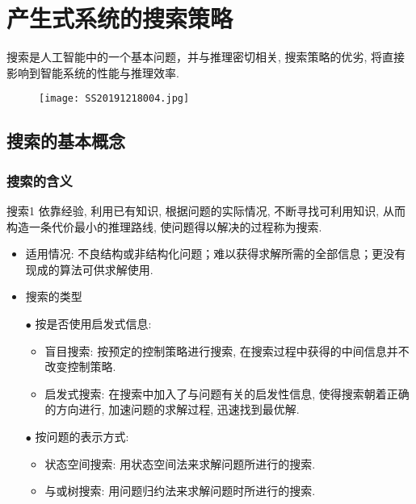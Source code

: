 \chapter{产生式系统的搜索策略}\label{AIchap4}
\begin{tcolorbox}[colback=white!50,colframe=orange!50,title=搜索]
搜索是人工智能中的一个基本问题，并与推理密切相关, 搜索策略的优劣, 将直接影响到智能系统的性能与推理效率.\hfill
\end{tcolorbox}
\begin{figure}[H]
\centering
\texttt{[image: SS20191218004.jpg]}
\label{SS20191218004}
\end{figure}
\section{搜索的基本概念}
\subsection{搜索的含义}
\begin{mydef}{搜索}{1}
依靠经验, 利用已有知识, 根据问题的实际情况, 不断寻找可利用知识, 从而构造一条代价最小的推理路线, 使问题得以解决的过程称为搜索.
\end{mydef}

\begin{itemize}
\item 适用情况: 不良结构或非结构化问题；难以获得求解所需的全部信息；更没有现成的算法可供求解使用.
\item 搜索的类型

    $\bullet$ 按是否使用启发式信息:
    \begin{itemize}
        \item 盲目搜索: 按预定的控制策略进行搜索, 在搜索过程中获得的中间信息并不改变控制策略.
        \item 启发式搜索: 在搜索中加入了与问题有关的启发性信息, 使得搜索朝着正确的方向进行, 加速问题的求解过程, 迅速找到最优解.
    \end{itemize}
    $\bullet$ 按问题的表示方式:
    \begin{itemize}
        \item 状态空间搜索: 用状态空间法来求解问题所进行的搜索.
        \item 与或树搜索: 用问题归约法来求解问题时所进行的搜索.
    \end{itemize}
\end{itemize}
